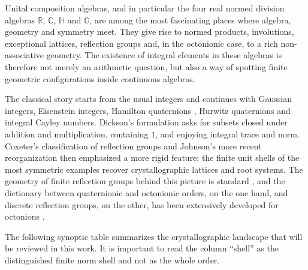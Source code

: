 \documentclass[12pt,oneside,english]{amsart}
\numberwithin{equation}{section}
\numberwithin{figure}{section}
\numberwithin{table}{section}
\theoremstyle{plain}
\theoremstyle{definition}
\theoremstyle{remark}
\newcommand{\RR}{\mathbb R}
\newcommand{\CC}{\mathbb C}
\newcommand{\HH}{\mathbb H}
\newcommand{\Oct}{\mathbb O}
\begin{document}
Unital composition algebras, and in particular the four real normed division algebras \(\RR\), \(\CC\), \(\HH\) and \(\Oct\), are among the most fascinating places where algebra, geometry and symmetry meet. They give rise to normed products, involutions, exceptional lattices, reflection groups and, in the octonionic case, to a rich non-associative geometry. The existence of integral elements in these algebras is therefore not merely an arithmetic question, but also a way of spotting finite geometric configurations inside continuous algebras.

The classical story starts from the usual integers \cite{Gau} and continues with Gaussian integers, Eisenstein integers, Hamilton quaternions \cite{Hu19}, Hurwitz quaternions and integral Cayley numbers. Dickson's formulation \cite{Di23} asks for subsets closed under addition and multiplication, containing \(1\), and enjoying integral trace and norm. Coxeter's classification of reflection groups \cite{Coxeter1934,Co46} and Johnson's more recent reorganization \cite{Jo13,Jo17,Jo18} then emphasized a more rigid feature: the finite unit shells of the most symmetric examples recover crystallographic lattices and root systems. The geometry of finite reflection groups behind this picture is standard \cite{Humphreys}, and the dictionary between quaternionic and octonionic orders, on the one hand, and discrete reflection groups, on the other, has been extensively developed for octonions \cite{CoSm}.

The following synoptic table summarizes the crystallographic landscape that will be reviewed in this work. It is important to read the column ``shell'' as the distinguished finite norm shell and not as the whole order.
\end{document}

